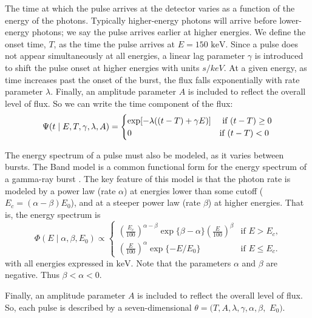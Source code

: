 \documentclass[iop,onecolumn]{emulateapj}
\begin{document}
The time at which the pulse arrives at the detector varies as a function of the energy of the photons. Typically higher-energy photons will arrive before lower-energy photons; we say the pulse arrives earlier at higher energies. We define the onset time, $T$, as the time the pulse arrives at $E = 150 $ $\mathrm{keV}$. Since a pulse does not appear simultaneously at all energies, a linear lag parameter $\gamma$ is introduced to shift the pulse onset at higher energies with units $s/keV$.  At a given energy, as time increases past the onset of the burst, the flux falls exponentially with rate parameter $\lambda$.  Finally, an amplitude parameter $A$ is included to reflect the overall level of flux.  So we can write the time component of the flux:
\begin{equation}
\Psi( t \mid E, T, \gamma,\lambda, A) = 
\begin{cases}
    \exp[ -\lambda( (t-T) + \gamma E) ]  &\text{ if $(t-T) \geq 0$} \\
    0 & \text{if $ (t - T) < 0 $}     
\end{cases}
\end{equation}
            
The energy spectrum of a pulse must also be modeled, as it varies between bursts.  The Band model is a common functional form for the energy spectrum of a gamma-ray burst \citet{Hurl:Ding:etal:1984}. The key feature of this model is that the photon rate is modeled by a power law (rate $\alpha$) at energies lower than some cutoff ($E_{c} = (\alpha - \beta) E_0$), and at a steeper power law (rate $\beta$) at higher energies. That is, the energy spectrum is
\begin{equation}
\Phi(E \mid \alpha, \beta, E_0) \propto  
\begin{cases} \left(\frac{E_c}{100}\right)^{\alpha - \beta} 
 \exp\{\beta - \alpha\}  \left(\frac{E}{100}\right)^\beta

 & \text{if $E > E_c $,}
\\
 \left(\frac{E}{100}\right)^\alpha \exp\{ - E/E_{0}\}

 &\text{if $E \leq E_c $.}
\end{cases}
\end{equation}
with all energies expressed in $\mathrm{keV}$. Note that the parameters $\alpha$ and $\beta$ are negative. Thus $\beta < \alpha < 0$.


Finally, an amplitude parameter $A$ is included to reflect the overall level of flux. 
So, each pulse is described by a seven-dimensional $\theta = (T, A, \lambda, \gamma, \alpha,\beta,$ $ E_0)$.
\end{document}
